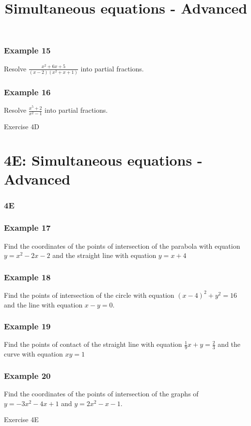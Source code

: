 \documentclass{beamer}
\begin{document}
\begin{frame}[t]
    \frametitle{Example 15}
    Resolve $\frac{x^2 + 6x + 5}{(x-2)(x^2 + x + 1)}$ into partial fractions.
\end{frame}
\begin{frame}
\end{frame}

\begin{frame}[t]
    \frametitle{Example 16}
    Resolve $\frac{x^5 + 2}{x^2-1}$ into partial fractions.
\end{frame}
\begin{frame}
\end{frame}

\begin{frame}{Exercise 4D}
\end{frame}
\section{4E: Simultaneous equations - Advanced}
\begin{frame} 
    \frametitle{4E}
    \begin{center}
        \title{Simultaneous equations - Advanced}
        \maketitle
    \end{center}
\end{frame}

\begin{frame}[t]
    \frametitle{Example 17}
    Find the coordinates of the points of intersection of the parabola with equation $y = x^2 -2x - 2$ and the straight line with equation 
    $y = x+ 4$
\end{frame}

\begin{frame}[t]
    \frametitle{Example 18}
    Find the points of intersection of the circle with equation $(x-4)^2 + y^2 = 16$ and the line with equation $x-y=0$.
\end{frame}

\begin{frame}[t]
    \frametitle{Example 19}
    Find the points of contact of the straight line with equation $\frac{1}{9}x+y = \frac{2}{3}$ and the curve with equation $xy = 1$
\end{frame}

\begin{frame}[t]
    \frametitle{Example 20}
    Find the coordinates of the points of intersection of the graphs of $y=-3x^2 -4x + 1$ and $y=2x^2 - x -1$.
\end{frame}
\begin{frame}{Exercise 4E}
\end{frame}
\end{document}
